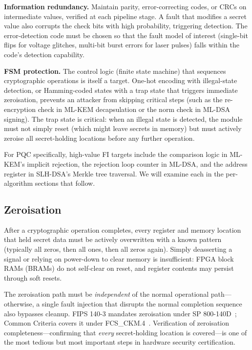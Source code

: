 \textbf{Information redundancy.}  Maintain parity, error-correcting codes, or CRCs on intermediate values, verified at each pipeline stage.  A fault that modifies a secret value also corrupts the check bits with high probability, triggering detection.  The error-detection code must be chosen so that the fault model of interest (single-bit flips for voltage glitches, multi-bit burst errors for laser pulses) falls within the code's detection capability.

\textbf{FSM protection.}  The control logic (finite state machine) that sequences cryptographic operations is itself a target.  One-hot encoding with illegal-state detection, or Hamming-coded states with a trap state that triggers immediate zeroisation, prevents an attacker from skipping critical steps (such as the re-encryption check in ML-KEM decapsulation or the norm check in ML-DSA signing).  The trap state is critical: when an illegal state is detected, the module must not simply reset (which might leave secrets in memory) but must actively zeroise all secret-holding locations before any further operation.

For PQC specifically, high-value FI targets include the comparison logic in ML-KEM's implicit rejection, the rejection loop counter in ML-DSA, and the address register in SLH-DSA's Merkle tree traversal.  We will examine each in the per-algorithm sections that follow.


\subsection{Zeroisation}
\label{subsec:zeroisation}

After a cryptographic operation completes, every register and memory location that held secret data must be actively overwritten with a known pattern (typically all zeros, then all ones, then all zeros again).  Simply deasserting a signal or relying on power-down to clear memory is insufficient: FPGA block RAMs (BRAMs) do not self-clear on reset, and register contents may persist through soft resets.

The zeroisation path must be \emph{independent} of the normal operational path---otherwise, a single fault injection that disrupts the normal completion sequence also bypasses cleanup.  FIPS 140-3 mandates zeroisation under SP 800-140D~\cite{FIPS140-3}; Common Criteria covers it under FCS\_CKM.4~\cite{CommonCriteria2022}.  Verification of zeroisation completeness---confirming that \emph{every} secret-holding location is covered---is one of the most tedious but most important steps in hardware security certification.

